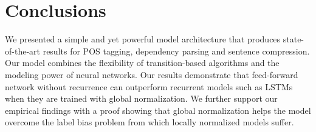 \section{Conclusions}

We presented a simple and yet powerful model architecture
that produces state-of-the-art results for POS tagging,
dependency parsing and sentence compression.
Our model combines the flexibility of transition-based algorithms and
the modeling power of neural networks.
Our results demonstrate that feed-forward network without
recurrence can outperform recurrent models such as LSTMs
when they are trained with global normalization.
We further support our empirical findings 
with a proof showing that global normalization
helps the model overcome the label bias problem
from which locally normalized models suffer.
